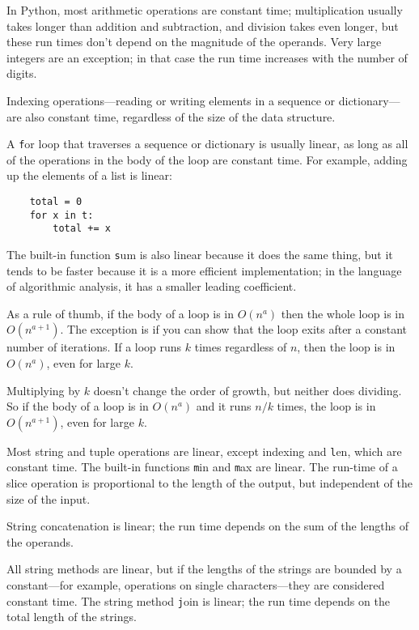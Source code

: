 \documentclass[
DIV=11,
fontsize=12,
twoside,
headinclude=false,
titlepage=firstiscover,
abstract=true,
headsepline=true,
footsepline=true,
chapterprefix=true, %
headings=big,
bibliography=totoc,%
captions=tableheading
]{scrbook}
\theoremstyle{definition}
\begin{document}
In Python, most arithmetic operations are constant time;
multiplication usually takes longer than addition and subtraction, and
division takes even longer, but these run times don't depend on the
magnitude of the operands.  Very large integers are an exception; in
that case the run time increases with the number of digits.

Indexing operations---reading or writing elements in a sequence
or dictionary---are also constant time, regardless of the size
of the data structure.

A {\texttt for} loop that traverses a sequence or dictionary is
usually linear, as long as all of the operations in the body
of the loop are constant time.  For example, adding up the
elements of a list is linear:

\begin{lstlisting}
    total = 0
    for x in t:
        total += x
\end{lstlisting}

The built-in function {\texttt sum} is also linear because it does
the same thing, but it tends to be faster because it is a more
efficient implementation; in the language of algorithmic analysis,
it has a smaller leading coefficient.

As a rule of thumb, if the body of a loop is in $O(n^a)$ then
the whole loop is in $O(n^{a+1})$.  The exception is if you can
show that the loop exits after a constant number of iterations.
If a loop runs $k$ times regardless of $n$, then
the loop is in $O(n^a)$, even for large $k$.

Multiplying by $k$ doesn't change the order of growth, but neither
does dividing.  So if the body of a loop is in $O(n^a)$ and it runs
$n/k$ times, the loop is in $O(n^{a+1})$, even for large $k$.

Most string and tuple operations are linear, except indexing and {\texttt
  len}, which are constant time.  The built-in functions {\texttt min} and
{\texttt max} are linear.  The run-time of a slice operation is
proportional to the length of the output, but independent of the size
of the input.

String concatenation is linear; the run time depends on the sum
of the lengths of the operands.

All string methods are linear, but if the lengths of
the strings are bounded by a constant---for example, operations on single
characters---they are considered constant time.
The string method {\texttt join} is linear; the run time depends on
the total length of the strings.
\end{document}
